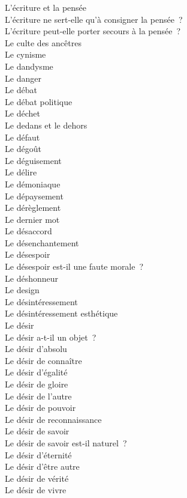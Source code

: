 \documentclass[a4paper,12pt]{article}
\begin{document}
L'écriture et la pensée \\
L'écriture ne sert-elle qu'à consigner la pensée ? \\
L'écriture peut-elle porter secours à la pensée ? \\
Le culte des ancêtres \\
Le cynisme \\
Le dandysme \\
Le danger \\
Le débat \\
Le débat politique \\
Le déchet \\
Le dedans et le dehors \\
Le défaut \\
Le dégoût \\
Le déguisement \\
Le délire \\
Le démoniaque \\
Le dépaysement \\
Le dérèglement \\
Le dernier mot \\
Le désaccord \\
Le désenchantement \\
Le désespoir \\
Le désespoir est-il une faute morale ? \\
Le déshonneur \\
Le design \\
Le désintéressement \\
Le désintéressement esthétique \\
Le désir \\
Le désir a-t-il un objet ? \\
Le désir d'absolu \\
Le désir de connaître \\
Le désir d'égalité \\
Le désir de gloire \\
Le désir de l'autre \\
Le désir de pouvoir \\
Le désir de reconnaissance \\
Le désir de savoir \\
Le désir de savoir est-il naturel ? \\
Le désir d'éternité \\
Le désir d'être autre \\
Le désir de vérité \\
Le désir de vivre \\
\end{document}
